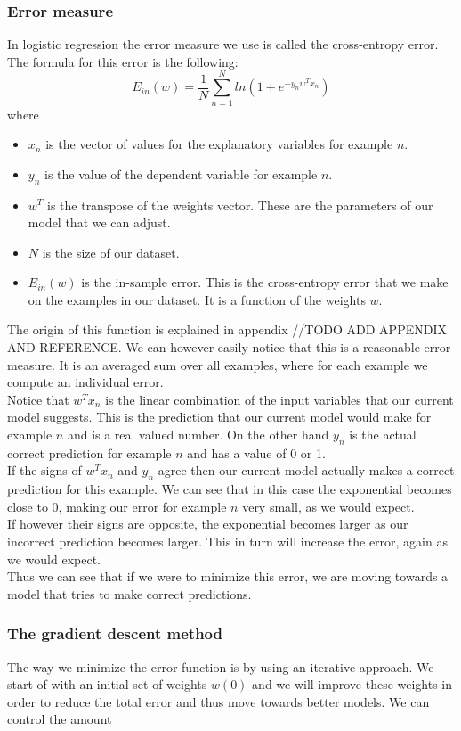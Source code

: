 \subsubsection{Error measure}
In logistic regression the error measure we use is called the cross-entropy error. The formula for this error is the following:
$$
	E_{in}(w) = \frac{1}{N}\sum_{n=1}^{N}ln(1+e^{-y_{n}w^{T}x_{n}})
$$
where
\begin{itemize}
	\item $x_{n}$ is the vector of values for the explanatory variables for example $n$.
	\item $y_{n}$ is the value of the dependent variable for example $n$.
	\item $w^T$ is the transpose of the weights vector. These are the parameters of our model that we can adjust.
	\item $N$ is the size of our dataset.
	\item $E_{in}(w)$ is the in-sample error. This is the cross-entropy error that we make on the examples in our dataset. It is a function of the weights $w$.
\end{itemize}
The origin of this function is explained in appendix //TODO ADD APPENDIX AND REFERENCE. We can however easily notice that this is a reasonable error measure. It is an averaged sum over all examples, where for each example we compute an individual error. \\
Notice that $w^{T}x_{n}$ is the linear combination of the input variables that our current model suggests. This is the prediction that our current model would make for example $n$ and is a real valued number. On the other hand $y_{n}$ is the actual correct prediction for example $n$ and has a value of 0 or 1.\\
If the signs of $w^{T}x_{n}$ and $y_{n}$ agree then our current model actually makes a correct prediction for this example. We can see that in this case the exponential becomes close to 0, making our error for example $n$ very small, as we would expect. \\
If however their signs are opposite, the exponential becomes larger as our incorrect prediction becomes larger. This in turn will increase the error, again as we would expect.\\
Thus we can see that if we were to minimize this error, we are moving towards a model that tries to make correct predictions.
\subsubsection{The gradient descent method}
The way we minimize the error function is by using an iterative approach. We start of with an initial set of weights $w(0)$ and we will improve these weights in order to reduce the total error and thus move towards better models. We can control the amount
